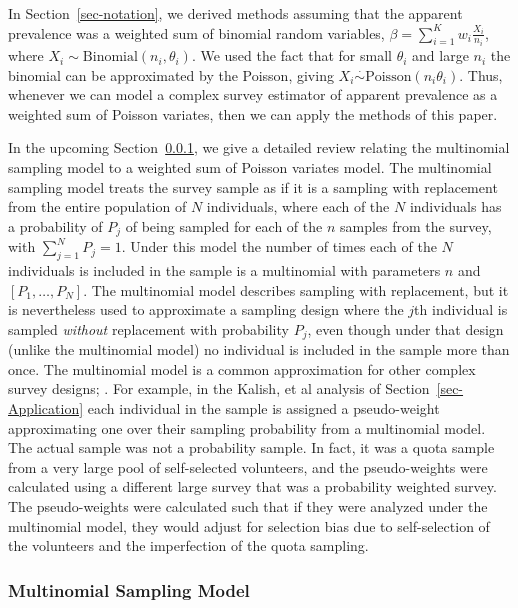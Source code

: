 \documentclass[AMA,STIX1COL]{WileyNJD-v2}
\begin{document}
In Section~\ref{sec-notation}, we derived methods assuming that the apparent prevalence was a weighted sum of binomial random variables,
$\beta = \sum_{i=1}^{K} w_i \frac{X_i}{n_i}$, where $X_i \sim \textrm{Binomial}(n_i,\theta_i)$. We used the fact that for small $\theta_i$ and large $n_i$
the binomial can be approximated by the Poisson, giving $X_i \stackrel{\cdot}{\sim} \textrm{Poisson}( n_i \theta_i)$.
Thus, whenever we can model a complex survey estimator of apparent prevalence as a weighted sum of Poisson variates, then we can apply the methods of this paper.

In the upcoming Section~\ref{sec-MultPoisson}, we give a detailed review relating the multinomial sampling model  to a weighted sum of Poisson variates model.
The multinomial sampling model treats the survey sample as if it is a sampling with replacement from the entire population of $N$ individuals, where each of the $N$
individuals has a probability of $P_j$ of being sampled for each of the $n$ samples from the survey, with $\sum_{j=1}^{N} P_j = 1$. Under this model the number of times each of the $N$ individuals
is included in the sample is a multinomial with parameters $n$ and $[P_1,\ldots, P_N]$.
The multinomial model describes sampling with replacement, but it is nevertheless used to approximate a sampling design where the $j$th  individual is sampled {\it without} replacement with probability $P_j$, even though under that design (unlike the multinomial model) no individual is included in the sample more than once. The multinomial model is a common approximation for other complex survey designs; \citep[see e.g., ][p. 14]{Korn:1999}.
For example, in the  Kalish, et al\cite{Kali:2021} analysis of Section~\ref{sec-Application} each individual in the sample is assigned a pseudo-weight approximating one over their sampling probability from
a multinomial model. The actual sample was not a probability sample. In fact, it was a quota sample from a very large pool of self-selected volunteers, and the pseudo-weights were calculated using a different large survey that was a probability weighted survey. The pseudo-weights were calculated such that if they were analyzed under the multinomial model, they would adjust for selection bias due to self-selection of the volunteers and the imperfection of the quota sampling.

\subsubsection{Multinomial Sampling Model}
\label{sec-MultPoisson}
\end{document}
